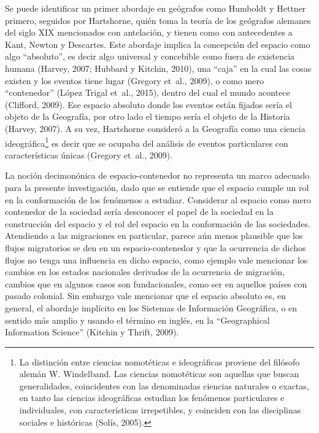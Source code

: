 \documentclass[12pt,spanish,]{article}
\begin{document}
Se puede identificar un primer abordaje en geógrafos como Humboldt y
Hettner primero, seguidos por Hartshorne, quién toma la teoría de los
geógrafos alemanes del siglo XIX mencionados con antelación, y tienen
como con antecedentes a Kant, Newton y Descartes. Este abordaje implica
la concepción del espacio como algo ``absoluto'', es decir algo
universal y concebible como fuera de existencia humana (Harvey, 2007;
Hubbard y Kitchin, 2010), una ``caja'' en la cual las cosas existen y
los eventos tiene lugar (Gregory et~al., 2009), o como mero
``contenedor'' (López Trigal et~al., 2015), dentro del cual el mundo
acontece (Clifford, 2009). Ese espacio absoluto donde los eventos están
fijados sería el objeto de la Geografía, por otro lado el tiempo sería
el objeto de la Historia (Harvey, 2007). A su vez, Hartshorne consideró
a la Geografía como una ciencia ideográfica\footnote{La distinción entre
  ciencias nomotéticas e ideográficas proviene del filósofo alemán W.
  Windelband. Las ciencias nomotéticas son aquellas que buscan
  generalidades, coincidentes con las denominadas ciencias naturales o
  exactas, en tanto las ciencias ideográficas estudian los fenómenos
  particulares e individuales, con características irrepetibles, y
  coinciden con las disciplinas sociales e históricas (Solís, 2005).} es
decir que se ocupaba del análisis de eventos particulares con
características únicas (Gregory et~al., 2009).

La noción decimonónica de espacio-contenedor no representa un marco
adecuado para la presente investigación, dado que se entiende que el
espacio cumple un rol en la conformación de los fenómenos a estudiar.
Considerar al espacio como mero contenedor de la sociedad sería
desconocer el papel de la sociedad en la construcción del espacio y el
rol del espacio en la conformación de las sociedades. Atendiendo a las
migraciones en particular, parece aún menos plausible que los flujos
migratorios se den en un espacio-contenedor y que la ocurrencia de
dichos flujos no tenga una influencia en dicho espacio, como ejemplo
vale mencionar los cambios en los estados nacionales derivados de la
ocurrencia de migración, cambios que en algunos casos son fundacionales,
como ser en aquellos países con pasado colonial. Sin embargo vale
mencionar que el espacio absoluto es, en general, el abordaje implícito
en los Sistemas de Información Geográfica, o en sentido más amplio y
usando el término en inglés, en la ``Geographical Information Science''
(Kitchin y Thrift, 2009).
\end{document}
